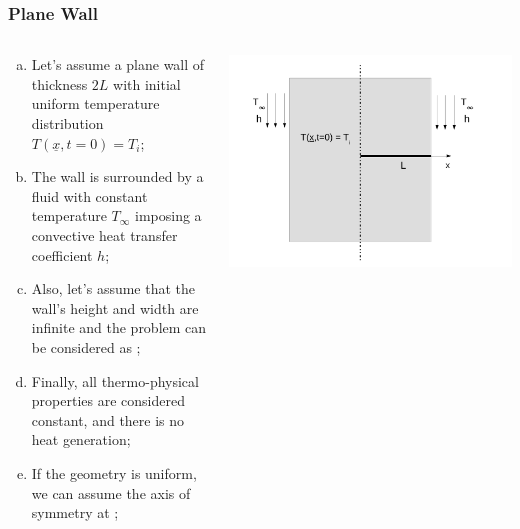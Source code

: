 \documentclass[10pt,compress,unknownkeysallowed]{beamer}
\begin{document}
\begin{frame}
 \frametitle{Plane Wall}
  \begin{columns}
    \begin{column}[l]{0.6\linewidth}
     \begin{enumerate}[(a)]%
        \item<1-> Let's assume a plane wall of thickness $2L$ with initial uniform temperature distribution $T\left(\underline{x},t=0\right)=T_{i}$;
        \item<1-> The wall is surrounded by a fluid with constant temperature $T_{\infty}$ imposing a convective heat transfer coefficient $h$;
        \item<1-> Also, let's assume that the wall's height and width are infinite and the problem can be considered as ;
        \item<1-> Finally, all thermo-physical properties are considered constant, and there is no heat generation;  
        \item<1-> If the geometry is uniform, we can assume the axis of symmetry at ;
     \end{enumerate}
    \end{column}
     \begin{column}[l]{0.4\linewidth}
        \begin{center}
          \includegraphics[width=1.1\columnwidth,height=1.3\columnwidth,clip]{./Pics/HT_PlaneWall}
        \end{center}
    \end{column}
  \end{columns}
\end{frame}
\end{document}
